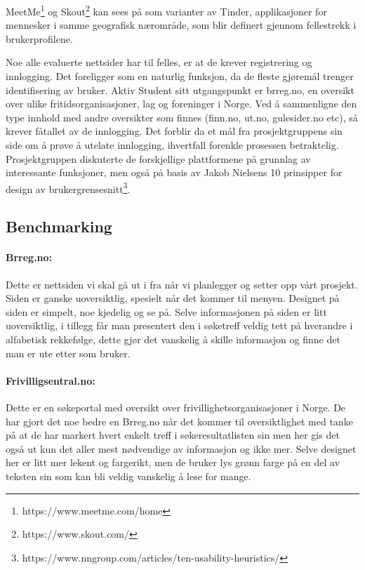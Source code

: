 MeetMe\footnote{https://www.meetme.com/home} og Skout\footnote{https://www.skout.com/} kan sees på som varianter av Tinder, applikasjoner for mennesker i samme geografisk nærområde, som blir definert gjennom fellestrekk i brukerprofilene.

\vspace{5mm} %

Noe alle evaluerte nettsider har til felles, er at de krever registrering og innlogging. Det foreligger som en naturlig funksjon, da de fleste gjøremål trenger identifisering av bruker. Aktiv Student sitt utgangspunkt er brreg.no, en oversikt over ulike fritidsorganisasjoner, lag og foreninger i Norge. Ved å sammenligne den type innhold med andre oversikter som finnes (finn.no, ut.no, gulesider.no etc), så krever fåtallet av de innlogging. Det forblir da et mål fra prosjektgruppens sin side om å prøve å utelate innlogging, ihvertfall forenkle prosessen betraktelig. Prosjektgruppen diskuterte de forskjellige plattformene på grunnlag av interessante funksjoner, men også på basis av Jakob Nielsens 10 prinsipper for design av brukergrensesnitt\footnote{https://www.nngroup.com/articles/ten-usability-heuristics/}.


\subsection{Benchmarking}

\paragraph{Brreg.no:}
Dette er nettsiden vi skal gå ut i fra når vi planlegger og setter opp vårt prosjekt.
Siden er ganske uoversiktlig, spesielt når det kommer til menyen.
Designet på siden er simpelt, noe kjedelig og se på.
Selve informasjonen på siden er litt uoversiktlig, i tillegg får man presentert den i søketreff veldig tett på hverandre i alfabetisk rekkefølge, dette gjør det vanskelig å skille informasjon og finne det man er ute etter som bruker.

\paragraph{Frivilligsentral.no:}
Dette er en søkeportal med oversikt over frivillighetsorganisasjoner i Norge. De har gjort det noe bedre en Brreg.no når det kommer til oversiktlighet med tanke på at de har markert hvert enkelt treff i søkeresultatlisten sin men her gis det også ut kun det aller mest nødvendige av informasjon og ikke mer. Selve designet her er litt mer lekent og fargerikt, men de bruker lys grønn farge på en del av teksten sin som kan bli veldig vanskelig å lese for mange.

